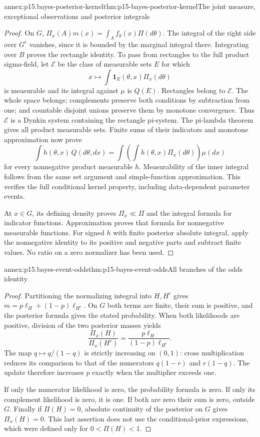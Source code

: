 \begin{annexitem}{annex:p15.bayes-posterior-kernel}{thm:p15-bayes-posterior-kernel}{The joint measure, exceptional observations and posterior integrals}
\begin{proof}
On \(G\), \(\Pi_x(A)m(x)=\int_A f_\theta(x)\Pi(d\theta)\).
The integral of the right side over \(G^c\) vanishes, since it is
bounded by the marginal integral there. Integrating over \(B\)
proves the rectangle identity. To pass from rectangles to the full
product sigma-field, let \(\mathcal E\) be the class of measurable
sets \(E\) for which
\[
 x\longmapsto\int\mathbf1_E(\theta,x)\Pi_x(d\theta)
\]
is measurable and its integral against \(\mu\) is \(Q(E)\).
Rectangles belong to \(\mathcal E\). The whole space belongs;
complements preserve both conditions by subtraction from one;
and countable disjoint unions preserve them by monotone convergence.
Thus \(\mathcal E\) is a Dynkin system containing the rectangle
pi-system. The pi-lambda theorem gives all product measurable sets.
Finite sums of their indicators and monotone approximation now prove
\[
 \int h(\theta,x)\,Q(d\theta,dx)
   =\int\left(\int h(\theta,x)\Pi_x(d\theta)\right)\mu(dx)
\]
for every nonnegative product measurable \(h\).
Measurability of the inner integral follows from the same
set argument and simple-function approximation. This verifies the full conditional
kernel property, including data-dependent parameter events.

At \(x\in G\), its defining density proves \(\Pi_x\ll\Pi\)
and the integral formula for indicator functions. Approximation
proves that formula for nonnegative measurable functions.
For signed \(h\) with finite posterior absolute integral, apply
the nonnegative identity to its positive and negative parts and
subtract finite values. No ratio on a zero normalizer has been used.
\end{proof}
\end{annexitem}

\begin{annexitem}{annex:p15.bayes-event-odds}{thm:p15-bayes-event-odds}{All branches of the odds identity}
\begin{proof}
Partitioning the normalizing integral into \(H,H^c\) gives
\(m=p\ell_H+(1-p)\ell_{H^c}\).
On \(G\) both terms are finite, their sum is positive, and the
posterior formula gives the stated probability. When both
likelihoods are positive, division of the two posterior masses yields
\[
 \frac{\Pi_x(H)}{\Pi_x(H^c)}
       =\frac{p\ell_H}{(1-p)\ell_{H^c}}.
\]
The map \(q\mapsto q/(1-q)\) is strictly increasing on \((0,1)\):
cross multiplication reduces its comparison to that of the numerators
\(q(1-r)\) and \(r(1-q)\). The update therefore increases \(p\)
exactly when the multiplier exceeds one.

If only the numerator likelihood is zero, the probability formula
is zero. If only its complement likelihood is zero, it is one.
If both are zero their sum is zero, outside \(G\).
Finally if \(\Pi(H)=0\), absolute continuity of the posterior
on \(G\) gives \(\Pi_x(H)=0\). This last assertion does not
use the conditional-prior expressions, which were defined only
for \(0<\Pi(H)<1\).
\end{proof}
\end{annexitem}

